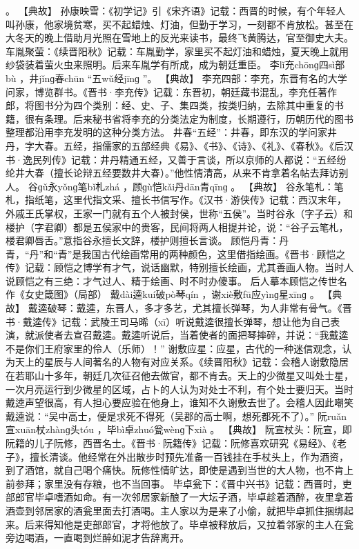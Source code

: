 \documentclass[12pt,UTF8]{ctexbook}
\begin{document}
。
【典故】
孙康映雪：《初学记》引《宋齐语》记载：西晋的时候，有个年轻人叫孙康，他家境贫寒，买不起蜡烛、灯油，但勤于学习，一刻都不肯放松。甚至在大冬天的晚上借助月光照在雪地上的反光来读书，最终飞黄腾达，官至御史大夫。
车胤聚萤：《续晋阳秋》记载：车胤勤学，家里买不起灯油和蜡烛，夏天晚上就用纱袋装着萤火虫来照明。后来车胤学有所成，成为朝廷重臣。
李lǐ充chōnɡ四sì部bù
，井jǐnɡ春chūn
“五wǔ经jīnɡ
”。
【典故】
李充四部：李充，东晋有名的大学问家，博览群书。《晋书·李充传》记载：东晋初，朝廷藏书混乱，李充任著作郎，将图书分为四个类别：经、史、子、集四类，按类归纳，去除其中重复的书籍，很有条理。后来秘书省将李充的分类法定为制度，长期遵行，历朝历代的图书整理都沿用李充发明的这种分类方法。
井春“五经”：井春，即东汉的学问家井丹，字大春。五经，指儒家的五部经典《易》、《书》、《诗》、《礼》、《春秋》。《后汉书·逸民列传》记载：井丹精通五经，又善于言谈，所以京师的人都说：“五经纷纶井大春（擅长论辩五经要数井大春）。”他性情清高，从来不肯拿着名帖去拜访别人。
谷ɡǔ永yǒnɡ笔bǐ札zhá
，顾ɡù恺kǎi丹dān青qīnɡ
。
【典故】
谷永笔札：笔札，指纸笔，这里代指文采、擅长书信写作。《汉书·游侠传》记载：西汉末年，外戚王氏掌权，王家一门就有五个人被封侯，世称“五侯”。当时谷永（字子云）和楼护（字君卿）都是五侯家中的贵客，民间将两人相提并论，说：“谷子云笔札，楼君卿唇舌。”意指谷永擅长文辞，楼护则擅长言谈。
顾恺丹青：丹青，“丹”和“青”是我国古代绘画常用的两种颜色，这里借指绘画。《晋书·顾恺之传》记载：顾恺之博学有才气，说话幽默，特别擅长绘画，尤其善画人物。当时人说顾恺之有三绝：才气过人、精于绘画、时不时办傻事。
后人摹本顾恺之传世名作《女史箴图》（局部）
戴dài逵kuí破pò琴qín
，谢xiè敷fū应yìnɡ星xīnɡ
。
【典故】
戴逵破琴：戴逵，东晋人，多才多艺，尤其擅长弹琴，为人非常有骨气。《晋书·戴逵传》记载：武陵王司马晞（xī）听说戴逵很擅长弹琴，想让他为自己表演，就派使者去宣召戴逵。戴逵听说后，当着使者的面把琴摔碎，并说：“我戴逵不是你们王府家里的伶人（乐师）！”
谢敷应星：应星，古代的一种迷信观念，认为天上的星辰与人间著名的人物有对应关系。《续晋阳秋》记载：会稽人谢敷隐居在若耶山十多年，朝廷几次征召他去做官，都不肯去。天上的少微星又叫处士星，一次月亮运行到少微星的区域，占卜的人认为对处士不利，有个处士要归天。当时戴逵声望很高，有人担心要应验在他身上，谁知不久谢敷去世了。会稽人因此嘲笑戴逵说：“吴中高士，便是求死不得死（吴郡的高士啊，想死都死不了）。”
阮ruǎn宣xuān杖zhànɡ头tóu
，毕bì卓zhuó瓮wènɡ下xià
。
【典故】
阮宣杖头：阮宣，即阮籍的儿子阮修，西晋名士。《晋书·阮籍传》记载：阮修喜欢研究《易经》、《老子》，擅长清谈。他经常在外出散步时预先准备一百钱挂在手杖头上，作为酒资，到了酒馆，就自己喝个痛快。阮修性情旷达，即使是遇到当世的大人物，也不肯上前参拜；家里没有存粮，也不当回事。
毕卓瓮下：《晋中兴书》记载：西晋时，吏部郎官毕卓嗜酒如命。有一次邻居家新酿了一大坛子酒，毕卓趁着酒醉，夜里拿着酒壶到邻居家的酒瓮里面去打酒喝。主人家以为是来了小偷，就把毕卓抓住捆绑起来。后来得知他是吏部郎官，才将他放了。毕卓被释放后，又拉着邻家的主人在瓮旁边喝酒，一直喝到烂醉如泥才告辞离开。
\end{document}
